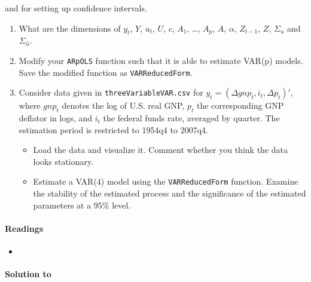   and for setting up confidence intervals.
\begin{enumerate}
\item What are the dimensions of \(y_t\), \(Y\), \(u_t\), \(U\), \(c\), \(A_1\), \ldots, \(A_p\), \(A\), \(\alpha\), \(Z_{t-1}\), \(Z\), \(\Sigma_u\) and \(\Sigma_{\hat{\alpha}}\).
\item Modify your \texttt{ARpOLS} function such that it is able to estimate VAR(p) models.
  Save the modified function as \texttt{VARReducedForm}.
\item Consider data given in \texttt{threeVariableVAR.csv} for \(y_t = (\Delta gnp_t,i_t,\Delta p_t)'\),
  where \(gnp_t\) denotes the log of U.S. real GNP,
  \(p_t\) the corresponding GNP deflator in logs,
  and \(i_t\) the federal funds rate, averaged by quarter.
The estimation period is restricted to 1954q4 to 2007q4. 
\begin{itemize}
	\item Load the data and visualize it. Comment whether you think the data looks stationary.
	\item Estimate a VAR(4) model using the \texttt{VARReducedForm} function.
	Examine the stability of the estimated process
	  and the significance of the estimated parameters at a \(95\% \) level.
\end{itemize}
\end{enumerate}

\paragraph{Readings}
\begin{itemize}
\item \textcite[Ch.~2.3]{Kilian.Lutkepohl_2017_StructuralVectorAutoregressive}
\end{itemize}

\begin{solution}\textbf{Solution to }
\ifDisplaySolutions

\fi
\newpage
\end{solution}